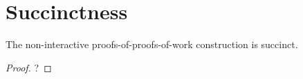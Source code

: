 \section{Succinctness}

\begin{theorem}
    The non-interactive proofs-of-proofs-of-work construction is succinct.
\end{theorem}

\begin{proof}
    ?
\end{proof}
